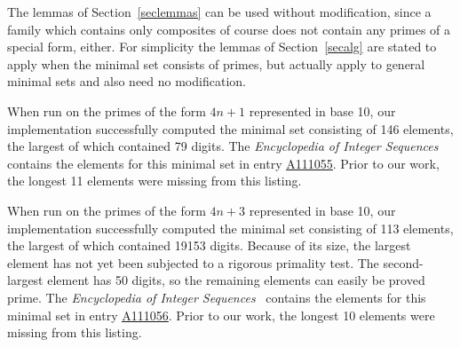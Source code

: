\documentclass[12pt]{article}
\theoremstyle{plain}
\theoremstyle{definition}
\newcommand{\0}{\mathtt{0}}
\newcommand{\1}{\mathtt{1}}
\newcommand{\2}{\mathtt{2}}
\newcommand{\3}{\mathtt{3}}
\newcommand{\4}{\mathtt{4}}
\newcommand{\5}{\mathtt{5}}
\newcommand{\6}{\mathtt{6}}
\newcommand{\7}{\mathtt{7}}
\newcommand{\8}{\mathtt{8}}
\newcommand{\9}{\mathtt{9}}
\newcommand{\seqnum}[1]{\href{http://oeis.org/#1}{\underline{#1}}}
\begin{document}
The lemmas of Section~\ref{seclemmas} can be used without modification, since a family which contains only composites
of course does not contain any primes of a special form, either.  For simplicity the lemmas of Section~\ref{secalg} are stated
to apply when the minimal set consists of primes, but actually apply to general minimal sets and also need no modification.

When run on the primes of the form $4n+1$ represented in base 10, our implementation successfully computed the minimal set
consisting of 146 elements, the largest of which contained 79 digits.  The 
{\it Encyclopedia of Integer Sequences}~\cite{oeis}
contains the elements for this minimal set in entry \seqnum{A111055}.  Prior to our work, the longest 11 elements were missing
from this listing.

When run on the primes of the form $4n+3$ represented in base 10, our implementation successfully computed the minimal set
consisting of 113 elements, the largest of which contained 19153 digits.  Because of its size, the largest element has not
yet been subjected to a rigorous primality test.  The second-largest element has 50 digits, so the remaining elements
can easily be proved prime.  The {\it Encyclopedia of Integer Sequences}~\cite{oeis}
contains the elements for this minimal set in entry \seqnum{A111056}.  Prior to our work, the longest 10 elements were missing
from this listing.
\end{document}
